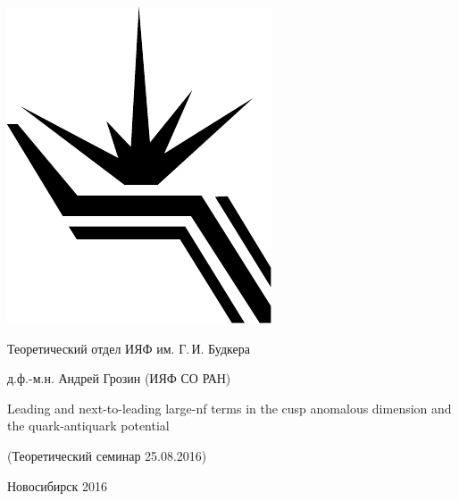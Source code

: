 \documentclass[12pt,pagesize,paper=landscape,paper=192mm:108mm]{scrbook}
\begin{document}
\begin{titlepage}
  \vspace*{-0.5em}
  \begin{center}    
    \hspace*{3em}
    \begin{minipage}[t]{3em}
      \includegraphics[width=\textwidth]{../BINP-logo}
    \end{minipage}\hfill
    Теоретический отдел ИЯФ им. Г.\,И. Будкера\hfill
    \hspace*{7em}
    \bigskip

    \large
    д.ф.-м.н. Андрей Грозин  (ИЯФ СО РАН)
    \bigskip
    \bigskip

    \LARGE Leading and next-to-leading large-nf terms in the cusp
    anomalous dimension and the quark-antiquark potential
    
    \bigskip

    \normalsize
    (Теоретический семинар 25.08.2016)
    \vfill

    \normalsize

    \normalsize \ccbysa\hspace{0.5em}  Новосибирск 2016
  \end{center}
\end{titlepage}
\end{document}
